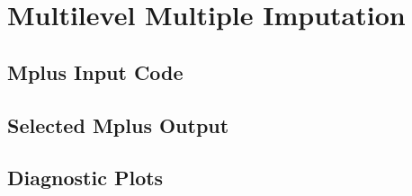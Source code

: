 \chapter{Multilevel Multiple Imputation}
\label{app:MMI}

\section{\textsf{Mplus} Input Code}
\label{sec:MMI_inp}



\section{Selected \textsf{Mplus} Output}
\label{sec:MMI_out}



\section{Diagnostic Plots}
\label{sec:MMI_diagnostic}

\newpage



